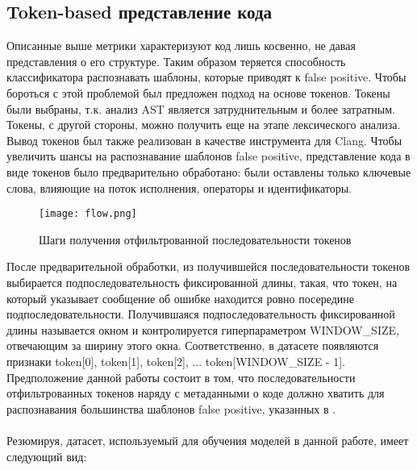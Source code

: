 \subsection{Token-based представление кода}
\label{sec:Tokens} 
Описанные выше метрики характеризуют код лишь косвенно, не давая представления о его структуре. Таким образом теряется способность классификатора распознавать шаблоны, которые приводят к false positive. Чтобы бороться с этой проблемой был предложен подход на основе токенов. Токены были выбраны, т.к. анализ AST является затруднительным и более затратным. Токены, с другой стороны, можно получить еще на этапе лексического анализа. Вывод токенов был также реализован в качестве инструмента для Clang. Чтобы увеличить шансы на распознавание шаблонов false positive, представление кода в виде токенов было предварительно обработано: были оставлены только ключевые слова, влияющие на поток исполнения, операторы и идентификаторы.

\begin{figure}[H]
    \centering
    \texttt{[image: flow.png]}
    \caption{Шаги получения отфильтрованной последовательности токенов}
\end{figure}

После предварительной обработки, из получившейся последовательности токенов выбирается подпоследовательность фиксированной длины, такая, что токен, на который указывает сообщение об ошибке находится ровно посередине подпоследовательности. Получившаяся подпоследовательность фиксированной длины называется окном и контролируется гиперпараметром WINDOW\_SIZE, отвечающим за ширину этого окна. Соответственно, в датасете появляются признаки token[0], token[1], token[2], ... token[WINDOW\_SIZE - 1]. Предположение данной работы состоит в том, что последовательности отфильтрованных токенов наряду с метаданными о коде должно хватить для распознавания большинства шаблонов false positive, указанных в \cite{Reynolds}.
\\
\\
Резюмируя, датасет, используемый для обучения моделей в данной работе, имеет следующий вид:

\begin{table}[H]
    \centering
    \caption{Общий вид элемента датасета}
\end{table}

